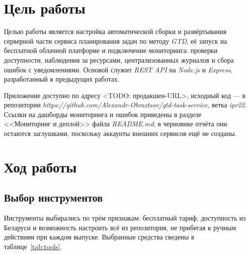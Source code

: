 \documentclass{stp}
\newcommand{\en}[1]{\textit{#1}}
\newcommand{\todo}[1]{\textless{}TODO: #1\textgreater{}}
\begin{document}

\section{Цель работы}

Целью работы является настройка автоматической сборки и развёртывания
серверной части сервиса планирования задач по методу \en{GTD}, её запуск на
бесплатной облачной платформе и подключение мониторинга: проверки
доступности, наблюдения за ресурсами, централизованных журналов и сбора
ошибок с уведомлениями. Основой служит \en{REST API} на \en{Node.js} и
\en{Express}, разработанный в предыдущих работах.

Приложение доступно по адресу \todo{продакшен-URL}, исходный код ---
в репозитории
\en{https://github.com/\allowbreak{}Alexandr-Obraztsov/\allowbreak{}gtd-task-service},
ветка \en{ipr22}. Ссылки на дашборды мониторинга и ошибок приведены в разделе
<<Мониторинг и деплой>> файла \en{README.md}; в черновике отчёта они остаются
заглушками, поскольку аккаунты внешних сервисов ещё не созданы.

\section{Ход работы}\label{sec:work}

\subsection{Выбор инструментов}

Инструменты выбирались по трём признакам: бесплатный тариф, доступность из
Беларуси и возможность настроить всё из репозитория, не прибегая к ручным
действиям при каждом выпуске. Выбранные средства сведены в таблице~\ref{tab:tools}.
\end{document}
